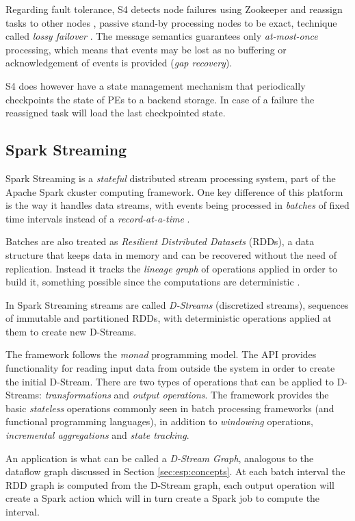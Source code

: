 \documentclass[ppgc,diss,english]{iiufrgs}
\begin{document}
Regarding fault tolerance, S4 detects node failures using Zookeeper and reassign tasks to other nodes \cite{bockermann2014survey}, passive stand-by processing nodes to be exact, technique called \emph{lossy failover} \cite{kamburugamuvesurvey}. The message semantics guarantees only \emph{at-most-once} processing, which means that events may be lost as no buffering or acknowledgement of events is provided (\emph{gap recovery}).

S4 does however have a state management mechanism that periodically checkpoints the state of PEs to a backend storage. In case of a failure the reassigned task will load the last checkpointed state.

\subsection{Spark Streaming}

Spark Streaming is a \emph{stateful} distributed stream processing system, part of the Apache Spark ckuster computing framework. One key difference of this platform is the way it handles data streams, with events being processed in \emph{batches} of fixed time intervals instead of a \emph{record-at-a-time} \cite{spark2015docs}.

Batches are also treated as \emph{Resilient Distributed Datasets} (RDDs), a data structure that keeps data in memory and can be recovered without the need of replication. Instead it tracks the \emph{lineage graph} of operations applied in order to build it, something possible since the computations are deterministic \cite{zaharia2013discretized}.

In Spark Streaming streams are called \emph{D-Streams} (discretized streams), sequences of immutable and partitioned RDDs, with deterministic operations applied at them to create new D-Streams.

The framework follows the \emph{monad} programming model. The API provides functionality for reading input data from outside the system in order to create the initial D-Stream. There are two types of operations that can be applied to D-Streams: \emph{transformations} and \emph{output operations}. The framework provides the basic \emph{stateless} operations commonly seen in batch processing frameworks (and functional programming languages), in addition to \emph{windowing} operations, \emph{incremental aggregations} and \emph{state tracking}.

An application is what can be called a \emph{D-Stream Graph}, analogous to the dataflow graph discussed in Section \ref{sec:esp:concepts}. At each batch interval the RDD graph is computed from the D-Stream graph, each output operation will create a Spark action which will in turn create a Spark job to compute the interval.
\end{document}
